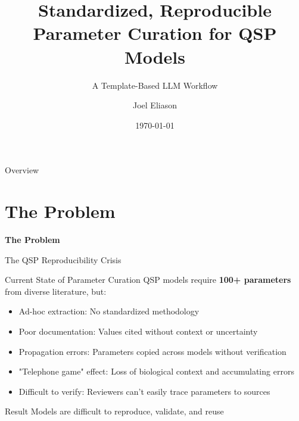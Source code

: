 \documentclass[10pt]{beamer}
\title{Standardized, Reproducible Parameter Curation for QSP Models}
\subtitle{A Template-Based LLM Workflow}
\author{Joel Eliason}
\date{\today}
\institute{Johns Hopkins University}
\begin{document}
\maketitle

\begin{frame}{Overview}
  \tableofcontents
\end{frame}

\section{The Problem}

\begin{frame}[plain,c]
  \begin{center}
    \Huge\textbf{The Problem}
  \end{center}
\end{frame}

\begin{frame}{The QSP Reproducibility Crisis}

  \begin{block}{Current State of Parameter Curation}
    QSP models require \textbf{100+ parameters} from diverse literature, but:
  \end{block}

  \vspace{0.3cm}

  \begin{itemize}
    \item \alert{Ad-hoc extraction}: No standardized methodology
    \item \alert{Poor documentation}: Values cited without context or uncertainty
    \item \alert{Propagation errors}: Parameters copied across models without verification
    \item \alert{"Telephone game" effect}: Loss of biological context and accumulating errors
    \item \alert{Difficult to verify}: Reviewers can't easily trace parameters to sources
  \end{itemize}

  \vspace{0.3cm}

  \begin{alertblock}{Result}
    Models are difficult to reproduce, validate, and reuse
  \end{alertblock}

\end{frame}
\end{document}
